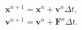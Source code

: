 \documentclass[10pt]{article}
\begin{document}
\begin{align*}{\boldsymbol x}^{n+1} = {\boldsymbol x}^{n} + {\boldsymbol v}^{n} \Delta t, \\
{\boldsymbol v}^{n+1} = {\boldsymbol v}^{n} + {\boldsymbol F}^{n} \Delta t.\end{align*}
\end{document}
